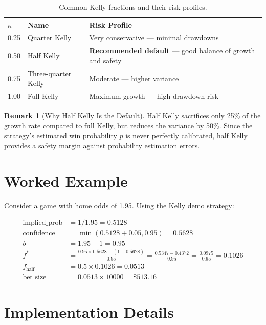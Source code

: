 \documentclass[12pt,a4paper]{report}
\theoremstyle{definition}
\newtheorem{remark}{Remark}[chapter]
\begin{document}
\begin{table}[H]
\centering
\caption{Common Kelly fractions and their risk profiles.}
\label{tab:kelly-fractions}
\begin{tabular}{lll}
\toprule
$\kappa$ & \textbf{Name} & \textbf{Risk Profile} \\
\midrule
0.25 & Quarter Kelly & Very conservative — minimal drawdowns \\
0.50 & Half Kelly    & \textbf{Recommended default} — good balance of growth and safety \\
0.75 & Three-quarter Kelly & Moderate — higher variance \\
1.00 & Full Kelly    & Maximum growth — high drawdown risk \\
\bottomrule
\end{tabular}
\end{table}

\begin{remark}[Why Half Kelly Is the Default]
Half Kelly sacrifices only 25\% of the growth rate compared to full Kelly, but reduces the variance by 50\%. Since the strategy's estimated win probability $p$ is never perfectly calibrated, half Kelly provides a safety margin against probability estimation errors.
\end{remark}

\section{Worked Example}

Consider a game with home odds of 1.95. Using the Kelly demo strategy:

\begin{align}
    \text{implied\_prob} &= 1 / 1.95 = 0.5128 \\
    \text{confidence} &= \min(0.5128 + 0.05, 0.95) = 0.5628 \\
    b &= 1.95 - 1 = 0.95 \\
    f^* &= \frac{0.95 \times 0.5628 - (1 - 0.5628)}{0.95} = \frac{0.5347 - 0.4372}{0.95} = \frac{0.0975}{0.95} = 0.1026 \\
    f_{\text{half}} &= 0.5 \times 0.1026 = 0.0513 \\
    \text{bet\_size} &= 0.0513 \times 10000 = \$513.16
\end{align}

\section{Implementation Details}
\end{document}
